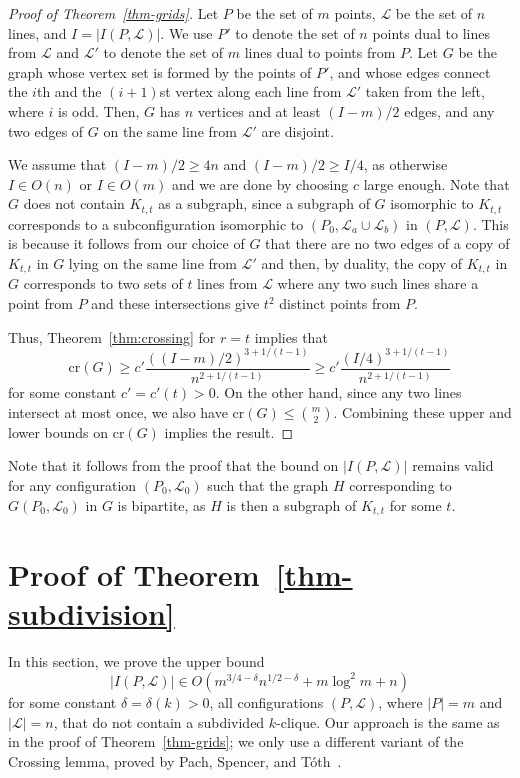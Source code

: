 \documentclass{article}
\begin{document}
\begin{proof}[Proof of Theorem~\ref{thm-grids}]
Let $P$ be the set of $m$ points, $\mathcal{L}$ be the set of $n$ lines, and $I=|I(P,\mathcal{L})|$. 
We use $P'$ to denote the set of $n$ points dual to lines from $\mathcal{L}$ and $\mathcal{L}'$ to denote the set of $m$ lines dual to points from $P$.
Let $G$ be the graph whose vertex set is formed by the points of $P'$, and whose edges connect the $i$th and the $(i+1)$st vertex along each line from $\mathcal{L}'$ taken from the left, where $i$ is odd.
Then, $G$ has $n$ vertices and at least $(I-m)/2$ edges, and any two edges of $G$ on the same line from $\mathcal{L}'$ are disjoint. 

We assume that $(I-m)/2 \geq 4n$ and $(I-m)/2 \geq I/4$, as otherwise $I \in O(n)$ or $I \in O(m)$ and we are done by choosing $c$ large enough.
Note that $G$ does not contain $K_{t,t}$ as a subgraph, since a subgraph of $G$ isomorphic to $K_{t,t}$ corresponds to a subconfiguration isomorphic to $(P_0,\mathcal{L}_a\cup\mathcal{L}_b)$ in $(P,\mathcal{L})$.
This is because it follows from our choice of $G$ that there are no two edges of a copy of $K_{t,t}$ in $G$ lying on the same line from $\mathcal{L}'$ and then, by duality, the copy of $K_{t,t}$ in $G$ corresponds to two sets of $t$ lines from $\mathcal{L}$ where any two such lines share a point from $P$ and these intersections give $t^2$ distinct points from $P$.

Thus, Theorem~\ref{thm:crossing} for $r=t$ implies that 
\[\textrm{cr}(G)\geq c'\frac{((I-m)/2)^{3+1/(t-1)}}{n^{2+1/(t-1)}}\geq c'\frac{(I/4)^{3+1/(t-1)}}{n^{2+1/(t-1)}}\]
for some constant $c'=c'(t)>0$.
On the other hand, since any two lines intersect at most once, we also have $\textrm{cr}(G)\leq \binom{m}{2}$.
Combining these upper and lower bounds on $\textrm{cr}(G)$ implies the result.
\end{proof}

Note that it follows from the proof that the bound on $|I(P,\mathcal{L})|$ remains valid for any configuration $(P_0,\mathcal{L}_0)$ such that the graph $H$ corresponding to $G(P_0,\mathcal{L}_0)$ in $G$ is bipartite, as $H$ is then a subgraph of $K_{t,t}$ for some $t$.


\section{Proof of Theorem~\ref{thm-subdivision}}

In this section, we prove the upper bound
\[|I(P,\mathcal{L}) |\in O(m^{3/4-\delta}n^{1/2-\delta}+m\log^2{m}+n)\]
for some constant $\delta=\delta(k)>0$, all configurations $(P,\mathcal{L})$, where $|P|=m$ and $|\mathcal{L}|=n$, that do not contain a subdivided $k$-clique.
Our approach is the same as in the proof of Theorem~\ref{thm-grids}; we only use a different variant of the Crossing lemma, proved by Pach, Spencer, and T\'{o}th~\cite{pachspencertoth}. 
\end{document}
